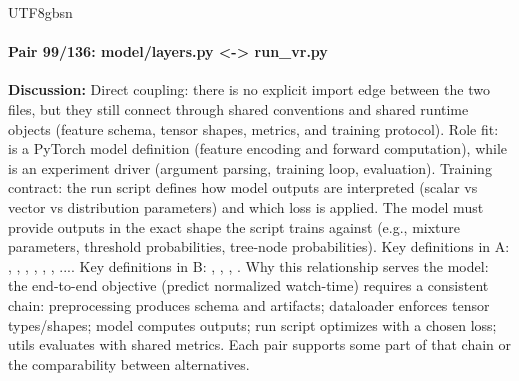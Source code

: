 \documentclass[11pt]{article}
\begin{document}
\begin{CJK*}{UTF8}{gbsn}
\paragraph{Pair 99/136: model/layers.py <-> run\_vr.py}
\textbf{Discussion:} Direct coupling: there is no explicit import edge between the two files, but they still connect through shared conventions and shared runtime objects (feature schema, tensor shapes, metrics, and training protocol). Role fit: \texttt{} is a PyTorch model definition (feature encoding and forward computation), while \texttt{} is an experiment driver (argument parsing, training loop, evaluation). Training contract: the run script defines how model outputs are interpreted (scalar vs vector vs distribution parameters) and which loss is applied. The model must provide outputs in the exact shape the script trains against (e.g., mixture parameters, threshold probabilities, tree-node probabilities). Key definitions in A: \texttt{}, \texttt{}, \texttt{}, \texttt{}, \texttt{}, \texttt{}, .... Key definitions in B: \texttt{}, \texttt{}, \texttt{}, \texttt{}. Why this relationship serves the model: the end-to-end objective (predict normalized watch-time) requires a consistent chain: preprocessing produces schema and artifacts; dataloader enforces tensor types/shapes; model computes outputs; run script optimizes with a chosen loss; utils evaluates with shared metrics. Each pair supports some part of that chain or the comparability between alternatives.


\end{CJK*}
\end{document}

